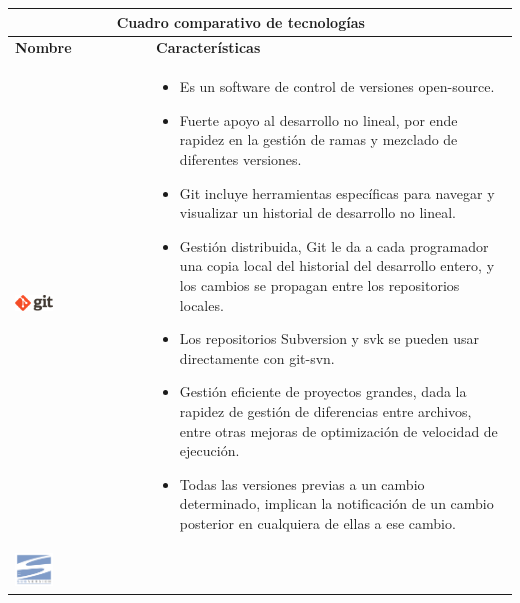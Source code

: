 \newpage
\begin{table}[b!]
    \centering
    \vspace{-30mm}
      \begin{tabular}{|p{2cm}|ll}
        \hline
        \multicolumn{2}{|c|}{{\bf Cuadro comparativo de tecnologías}} \\ 
        \hline
          \multicolumn{1}{|p{4cm}|}{{\bf Nombre}} & 
		  \multicolumn{1}{p{10cm}|}{{\bf Características}}\\
        \hline
          \multicolumn{1}{|p{5cm}|}{\includegraphics[width=0.3\textwidth]{images/git}} & 
          \multicolumn{2}{p{10cm}|}{\begin{itemize}
          \vspace{-17mm}
        \item Es un software de control de versiones open-source.
        \item Fuerte apoyo al desarrollo no lineal, por ende rapidez en la gestión de ramas y mezclado de diferentes versiones. 
        \item Git incluye herramientas específicas para navegar y visualizar un historial de desarrollo no lineal.
        \item Gestión distribuida, Git le da a cada programador una copia local del historial del desarrollo entero, y los cambios se propagan entre los repositorios locales.
         \item Los repositorios Subversion y svk se pueden usar directamente con git-svn.
        \item Gestión eficiente de proyectos grandes, dada la rapidez de gestión de diferencias entre archivos, entre otras mejoras de optimización de velocidad de ejecución.
        \item Todas las versiones previas a un cambio determinado, implican la notificación de un cambio posterior en cualquiera de ellas a ese cambio.\cite{38}
      \end{itemize}} \\
        \hline
          \multicolumn{1}{|p{5cm}|}{\includegraphics[width=0.3\textwidth]{images/subversion}} & 

\end{tabular}
\end{table}
